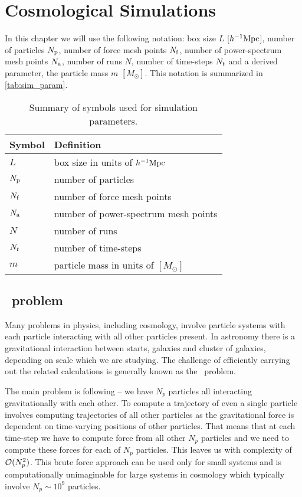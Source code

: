 \chapter{Cosmological Simulations}
\label{chpt:cosmo_sim}


In this chapter we will use the following notation: box size $L$ [$h^{-1}\text{Mpc}$], number of particles $N_{\rm p}$, number of force mesh points $N_{\rm f}$, number of power-spectrum mesh points $N_{\rm a}$, number of runs $N$, number of time-steps $N_t$ and a derived parameter, the particle mass $m$ $[M_\odot]$. This notation is summarized in \autoref{tab:sim_param}.

\begin{table}
\begin{tabular}{ll}
    \hline \hline
    Symbol & Definition \\
    \hline
    $L$ & box size in units of $h^{-1}\text{Mpc}$ \\
    $N_{\rm p}$ & number of particles \\
    $N_{\rm f}$ & number of force mesh points \\
    $N_{\rm a}$ & number of power-spectrum mesh points \\
    $N$ & number of runs \\
    $N_t$ & number of time-steps \\
    $m$ & particle mass in units of $[M_\odot]$ \\
    \hline \hline
\end{tabular}
\caption{Summary of symbols used for simulation parameters.}
\label{tab:sim_param}
\end{table}


\section{\nbody\ problem}
Many problems in physics, including cosmology, involve particle systems with each particle interacting with all other particles present. In astronomy there is a gravitational interaction between starts, galaxies and cluster of galaxies, depending on scale which we are studying. The challenge of efficiently carrying out the related calculations is generally known as the \nbody\ problem.

The main problem is following -- we have $N_p$ particles all interacting gravitationally with each other. To compute a trajectory of even a single particle involves computing trajectories of all other particles as the gravitational force is dependent on time-varying positions of other particles. That means that at each time-step we have to compute force from all other $N_p$ particles and we need to compute these forces for each of $N_p$ particles. This leaves us with complexity of \(\mathcal{O}(N_p^2)\). This brute force approach can be used only for small systems and is computationally unimaginable for large systems in cosmology which typically involve \(N_p\sim10^{9}\) particles.

